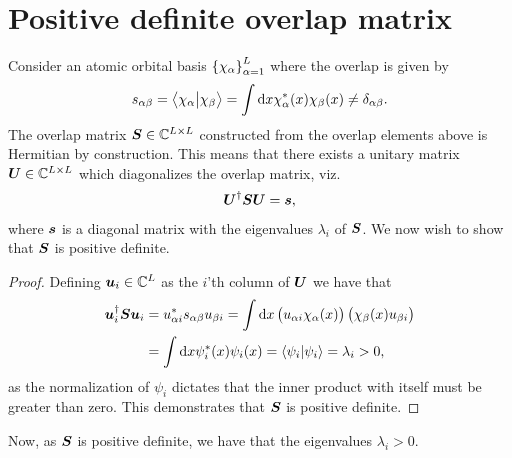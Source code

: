     \section{Positive definite overlap matrix}
        \label{app:positive-definite-overlap}
        Consider an atomic orbital basis $\left\{ \chi_{\alpha} \right\}_{\alpha = 1}^{L}$
        where the overlap is given by
        \begin{align}
            s_{\alpha\beta}
            = \braket{\chi_{\alpha}}{\chi_{\beta}}
            = \int\dd x \chi^{*}_{\alpha}(x)\chi_{\beta}(x)
            \neq \delta_{\alpha\beta}.
        \end{align}
        The overlap matrix $\boldsymbol{S} \in \mathbb{C}^{L \times L}$ constructed
        from the overlap elements above is Hermitian by construction.
        This means that there exists a unitary matrix $\boldsymbol{U} \in \mathbb{C}^{L
        \times L}$ which diagonalizes the overlap matrix, viz.
        \begin{align}
            \boldsymbol{U}^{\dagger}\boldsymbol{S}\boldsymbol{U}
            = \boldsymbol{s},
        \end{align}
        where $\boldsymbol{s}$ is a diagonal matrix with the eigenvalues $\lambda_i$ of
        $\boldsymbol{S}$.
        We now wish to show that $\boldsymbol{S}$ is positive definite.
        \begin{proof}
            Defining $\boldsymbol{u}_{i} \in \mathbb{C}^{L}$ as the $i$'th column of
            $\boldsymbol{U}$ we have that
            \begin{align}
                \boldsymbol{u}_{i}^{\dagger}\boldsymbol{S}\boldsymbol{u}_i
                &= u^{*}_{\alpha i}
                s_{\alpha\beta}
                u_{\beta i}
                = \int\dd x
                \left( 
                    u_{\alpha i}
                    \chi_{\alpha}(x)
                 \right)
                \left( 
                    \chi_{\beta}(x)
                    u_{\beta i}
                 \right)
                \\
                &=
                \int \dd x
                \psi^{*}_i(x)
                \psi_i(x)
                =
                \braket{\psi_i}{\psi_i}
                = \lambda_i
                > 0,
            \end{align}
            as the normalization of $\psi_i$ dictates that the inner product with
            itself must be greater than zero.
            This demonstrates that $\boldsymbol{S}$ is positive definite.
        \end{proof}
        Now, as $\boldsymbol{S}$ is positive definite, we have that the eigenvalues
        $\lambda_i > 0$.

